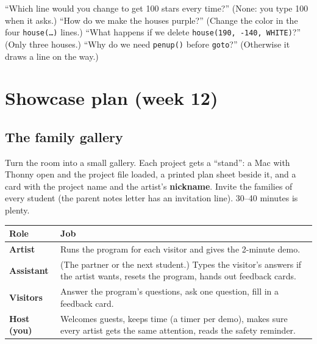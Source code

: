 \documentclass[level=1,teacher]{kidscode}
\begin{document}
\begin{tip}
\enquote{Which line would you change to get 100 stars every time?} (None: you type 100 when it asks.)
\enquote{How do we make the houses purple?} (Change the color in the four \texttt{house(\dots)} lines.)
\enquote{What happens if we delete \texttt{house(190, -140, WHITE)}?} (Only three houses.)
\enquote{Why do we need \texttt{penup()} before \texttt{goto}?} (Otherwise it draws a line on the way.)
\end{tip}

\section{Showcase plan (week 12)}

\subsection{The family gallery}
Turn the room into a small gallery. Each project gets a \enquote{stand}: a Mac with Thonny open and the
project file loaded, a printed plan sheet beside it, and a card with the project name and the
artist's \textbf{nickname}. Invite the families of every student (the parent notes letter has an
invitation line). 30--40 minutes is plenty.

\begin{center}\small\renewcommand{\arraystretch}{1.3}
\begin{tabularx}{\linewidth}{@{}>{\bfseries}p{2.6cm}X@{}}
\toprule
Role & Job\\
\midrule
Artist & Runs the program for each visitor and gives the 2-minute demo.\\
Assistant & (The partner or the next student.) Types the visitor's answers if the artist wants, resets the program, hands out feedback cards.\\
Visitors & Answer the program's questions, ask one question, fill in a feedback card.\\
Host (you) & Welcomes guests, keeps time (a timer per demo), makes sure every artist gets the same attention, reads the safety reminder.\\
\bottomrule
\end{tabularx}
\end{center}
\end{document}
